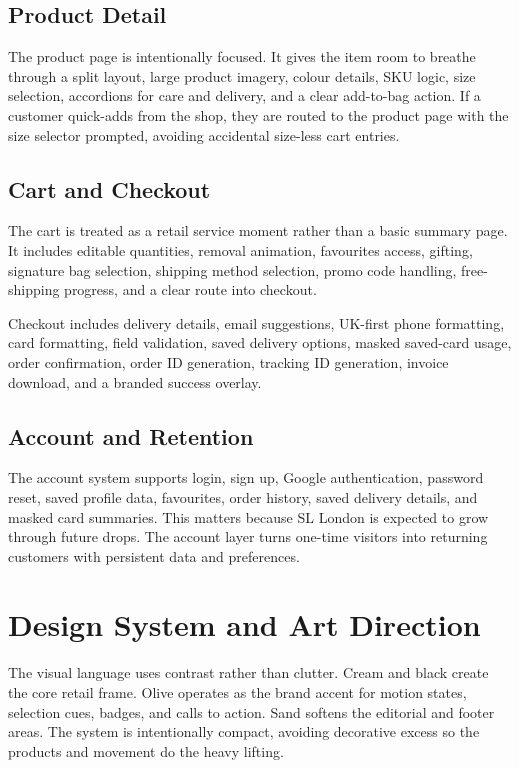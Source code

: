 \documentclass[11pt,a4paper]{article}
\newcommand{\project}{SL London}
\begin{document}
\subsection{Product Detail}

The product page is intentionally focused. It gives the item room to breathe through a split layout, large product imagery, colour details, SKU logic, size selection, accordions for care and delivery, and a clear add-to-bag action. If a customer quick-adds from the shop, they are routed to the product page with the size selector prompted, avoiding accidental size-less cart entries.

\subsection{Cart and Checkout}

The cart is treated as a retail service moment rather than a basic summary page. It includes editable quantities, removal animation, favourites access, gifting, signature bag selection, shipping method selection, promo code handling, free-shipping progress, and a clear route into checkout.

Checkout includes delivery details, email suggestions, UK-first phone formatting, card formatting, field validation, saved delivery options, masked saved-card usage, order confirmation, order ID generation, tracking ID generation, invoice download, and a branded success overlay.

\subsection{Account and Retention}

The account system supports login, sign up, Google authentication, password reset, saved profile data, favourites, order history, saved delivery details, and masked card summaries. This matters because \project{} is expected to grow through future drops. The account layer turns one-time visitors into returning customers with persistent data and preferences.

\section{Design System and Art Direction}

The visual language uses contrast rather than clutter. Cream and black create the core retail frame. Olive operates as the brand accent for motion states, selection cues, badges, and calls to action. Sand softens the editorial and footer areas. The system is intentionally compact, avoiding decorative excess so the products and movement do the heavy lifting.
\end{document}
